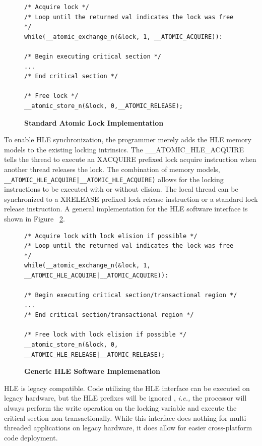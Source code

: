 \documentclass[11pt]{book}
\begin{document}
\linespread{1.0}
\begin{figure}
\begin{verbatim}
/* Acquire lock */
/* Loop until the returned val indicates the lock was free */
while(__atomic_exchange_n(&lock, 1, __ATOMIC_ACQUIRE)):

/* Begin executing critical section */
...
/* End critical section */

/* Free lock */
__atomic_store_n(&lock, 0,__ATOMIC_RELEASE);
\end{verbatim}
    \caption{\textbf{Standard Atomic Lock Implementation}}
    \label{fig:lock_interface}
\end{figure}

To enable HLE synchronization, the programmer merely adds the HLE memory models
to the existing locking intrinsics.  The \_\_ATOMIC\_HLE\_ACQUIRE tells the
thread to execute an XACQUIRE prefixed lock acquire instruction when another
thread releases the lock.  The combination of memory models,
\texttt{\_\_ATOMIC\_HLE\_ACQUIRE|\_\_ATOMIC\_HLE\_ACQUIRE)} allows for the
locking instructions to be executed with or without elision.  The local thread
can be synchronized to a XRELEASE prefixed lock release instruction or a
standard lock release instruction.  A general implementation for the HLE
software interface is shown in Figure ~\ref{fig:hle_interface}. 

\linespread{1.0}
\begin{figure}
\begin{verbatim}
/* Acquire lock with lock elision if possible */
/* Loop until the returned val indicates the lock was free */
while(__atomic_exchange_n(&lock, 1, __ATOMIC_HLE_ACQUIRE|__ATOMIC_ACQUIRE)):

/* Begin executing critical section/transactional region */
...
/* End critical section/transactional region */

/* Free lock with lock elision if possible */
__atomic_store_n(&lock, 0, __ATOMIC_HLE_RELEASE|__ATOMIC_RELEASE);
\end{verbatim}
    \caption{\textbf{Generic HLE Software Implemenation}}
    \label{fig:hle_interface}
\end{figure}

HLE is legacy compatible.  Code utilizing the HLE interface can be executed on legacy
hardware, but the HLE prefixes will be ignored \cite{intel_prog_ref}, \emph{i.e.,} the
processor will always perform the write operation on the locking variable and execute the
critical section non-transactionally.  While this interface does nothing for
multi-threaded applications on legacy hardware, it does allow for easier cross-platform
code deployment.
\end{document}
